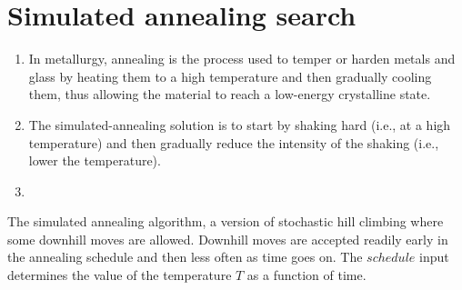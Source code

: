 \section{Simulated annealing search \cite{ai/book/Artificial-Intelligence-A-Modern-Approach/Russell-Norvig}}
\label{AI: Algorithms/Simulated annealing search}


\begin{enumerate}
    \item In metallurgy, annealing is the process used to temper or harden metals and glass by heating them to a high temperature and then gradually cooling them, thus allowing the material to reach a low-energy crystalline state.
    \hfill \cite{ai/book/Artificial-Intelligence-A-Modern-Approach/Russell-Norvig}

    \item The simulated-annealing solution is to start by shaking hard (i.e., at a high temperature) and then gradually reduce the intensity of the shaking (i.e., lower the temperature).
    \hfill \cite{ai/book/Artificial-Intelligence-A-Modern-Approach/Russell-Norvig}

    \item 
    \hfill \cite{ai/book/Artificial-Intelligence-A-Modern-Approach/Russell-Norvig}
\end{enumerate}


\vspace{0.5cm}

\begin{algorithm}[H]
    \caption{
        The simulated annealing algorithm, a version of stochastic hill climbing where some downhill moves are allowed. 
        Downhill moves are accepted readily early in the annealing schedule and then less often as time goes on. 
        The $schedule$ input determines the value of the temperature $T$ as a function of time. 
        \cite{ai/book/Artificial-Intelligence-A-Modern-Approach/Russell-Norvig}
    }


\end{algorithm}


